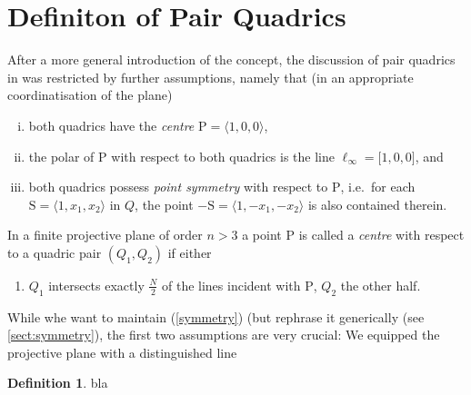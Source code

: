 \documentclass[12pt,english,paper=a4,DIV=12,headings=small,numbers=noenddot,parskip=half]{scrartcl}
\theoremstyle{definition}
\newtheorem{defi}{Definition}[section]
\begin{document}
\section{Definiton of Pair Quadrics}

After a more general introduction of the concept, the discussion of pair quadrics in \cite{Alex:Th12} was restricted by further assumptions, namely that (in an appropriate coordinatisation of the plane)
\begin{enumerate}[i.]
\item{both quadrics have the \emph{centre} $\mathrm{P}=\langle1,0,0\rangle$,}
\item{the polar of $\mathrm{P}$ with respect to both quadrics is the line $\ell_\infty=\lbrack1,0,0\rbrack$, and}
\item{both quadrics possess \emph{point symmetry} with respect to $\mathrm{P}$, i.e.\ for each $\mathrm{S}=\langle1,x_1,x_2\rangle$ in $Q$, the point $\mathrm{-S}=\langle1,-x_1,-x_2\rangle$ is also contained therein.\label{symmetry}}
\end{enumerate}

In a finite projective plane of order $n>3$ a point $\mathrm{P}$ is called a \emph{centre} with respect to a quadric pair $(Q_1,Q_2)$ if either
\begin{enumerate}[{i}a]
\item{$Q_1$ intersects exactly $\frac{N}{2}$ of the lines incident with $\mathrm{P}$, $Q_2$ the other half. }
\end{enumerate}

While whe want to maintain (\ref{symmetry}) (but rephrase it generically (see \ref{sect:symmetry}), the first two assumptions are very crucial: We equipped the projective plane with a distinguished line

\begin{defi}
bla
\end{defi}
\end{document}
